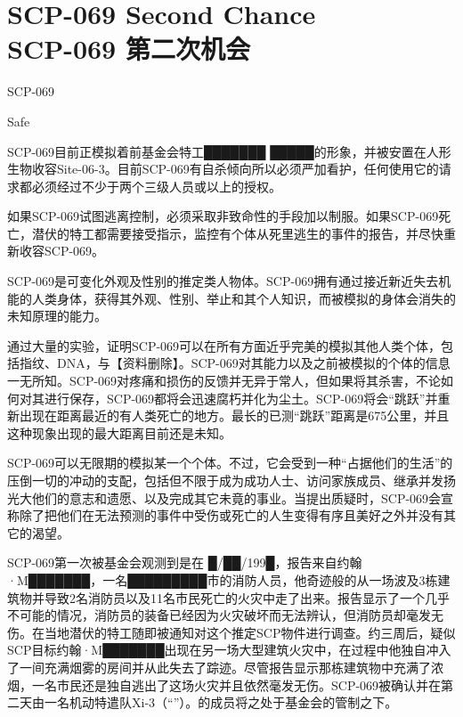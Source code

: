\chapter[SCP-069 第二次机会]{
    SCP-069 Second Chance\\
    SCP-069 第二次机会
}

\label{chap:SCP-069}

SCP-069

Safe

SCP-069目前正模拟着前基金会特工███████ █████的形象，并被安置在人形生物收容Site-06-3。目前SCP-069有自杀倾向所以必须严加看护，任何使用它的请求都必须经过不少于两个三级人员或以上的授权。

如果SCP-069试图逃离控制，必须采取非致命性的手段加以制服。如果SCP-069死亡，潜伏的特工都需要接受指示，监控有个体从死里逃生的事件的报告，并尽快重新收容SCP-069。


SCP-069是可变化外观及性别的推定类人物体。SCP-069拥有通过接近新近失去机能的人类身体，获得其外观、性别、举止和其个人知识，而被模拟的身体会消失的未知原理的能力。

通过大量的实验，证明SCP-069可以在所有方面近乎完美的模拟其他人类个体，包括指纹、DNA，与【资料删除】。SCP-069对其能力以及之前被模拟的个体的信息一无所知。SCP-069对疼痛和损伤的反馈并无异于常人，但如果将其杀害，不论如何对其进行保存，SCP-069都将会迅速腐朽并化为尘土。SCP-069将会“跳跃”并重新出现在距离最近的有人类死亡的地方。最长的已测“跳跃”距离是675公里，并且这种现象出现的最大距离目前还是未知。

SCP-069可以无限期的模拟某一个个体。不过，它会受到一种“占据他们的生活”的压倒一切的冲动的支配，包括但不限于成为成功人士、访问家族成员、继承并发扬光大他们的意志和遗愿、以及完成其它未竟的事业。当提出质疑时，SCP-069会宣称除了把他们在无法预测的事件中受伤或死亡的人生变得有序且美好之外并没有其它的渴望。

SCP-069第一次被基金会观测到是在 █\slash ██\slash 199█，报告来自约翰·M███████，一名█████████市的消防人员，他奇迹般的从一场波及3栋建筑物并导致2名消防员以及11名市民死亡的火灾中走了出来。报告显示了一个几乎不可能的情况，消防员的装备已经因为火灾破坏而无法辨认，但消防员却毫发无伤。在当地潜伏的特工随即被通知对这个推定SCP物件进行调查。约三周后，疑似SCP目标约翰·M███████出现在另一场大型建筑火灾中，在过程中他独自冲入了一间充满烟雾的房间并从此失去了踪迹。尽管报告显示那栋建筑物中充满了浓烟，一名市民还是独自逃出了这场火灾并且依然毫发无伤。SCP-069被确认并在第二天由一名机动特遣队Xi-3（“”）。的成员将之处于基金会的管制之下。


